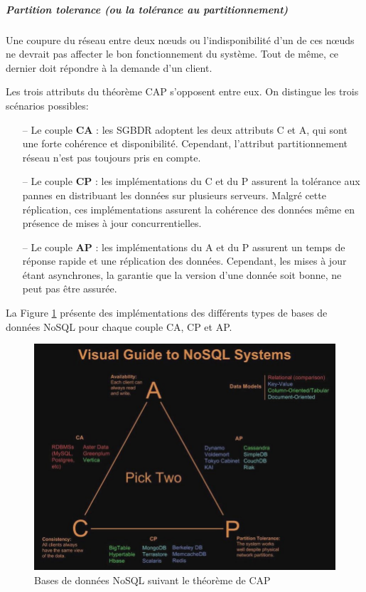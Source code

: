 			 \subparagraph{Partition tolerance (ou la tolérance au partitionnement) } Une coupure du réseau entre deux n\oe{}uds ou l'indisponibilité d'un de ces n\oe{}uds ne devrait pas affecter le bon fonctionnement du système. Tout de même,  ce dernier doit répondre à la demande d'un client. 

		
		Les trois attributs du théorème CAP s'opposent entre eux. On distingue les trois scénarios possibles:
		
		\begin{itemize}
			\item [--] Le couple \textbf{CA} : les SGBDR adoptent les deux attributs C et A, qui sont une forte cohérence et disponibilité. Cependant, l'attribut partitionnement réseau n'est pas toujours pris en compte.
			\item [--] Le couple \textbf{CP} : les implémentations du C et du P assurent la tolérance aux pannes en distribuant les données sur plusieurs serveurs. Malgré cette réplication, ces implémentations assurent la cohérence des données même en présence de mises à jour concurrentielles.
			\item [--] Le couple \textbf{AP} : les implémentations du A et du  P assurent un temps de réponse rapide et une réplication des données. Cependant, les mises à jour étant asynchrones, la garantie que la version d'une donnée soit bonne, ne peut pas être assurée.
			
		\end{itemize}
		
		La Figure \ref{fig:cap} présente des implémentations des différents types de bases de données NoSQL pour chaque couple CA, CP et AP.
		
		\begin{figure}[H]
			\centering
			\captionsetup{justification=centering}
			\includegraphics[width=1\linewidth]{illustrations/cap}
			\caption{Bases de données NoSQL suivant le théorème de CAP }
			\label{fig:cap}
		\end{figure}
		
